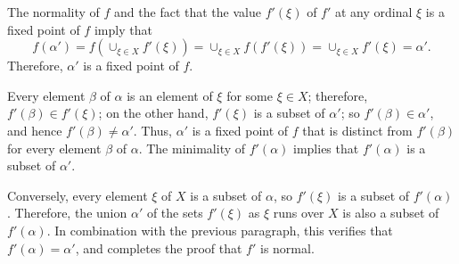\documentclass{article}
\begin{document}
\begin{solution}[\ref{exe:e5fhwe1c}]
  The normality of \(f\) and the fact that the value \(f'(\xi)\) of
  \(f'\) at any ordinal \(\xi\) is a fixed point of \(f\) imply that
  \begin{displaymath}
    f(\alpha') =
    f(\cup_{\xi \in X} f'(\xi)) =
    \cup_{\xi \in X} f(f'(\xi)) =
    \cup_{\xi \in X} f'(\xi) =
    \alpha'.
  \end{displaymath}
  Therefore, \(\alpha'\) is a fixed point of \(f\).

  Every element \(\beta\) of \(\alpha\) is an element of \(\xi\) for
  some \(\xi \in X\); therefore, \(f'(\beta) \in f'(\xi)\); on the
  other hand, \(f'(\xi)\) is a subset of \(\alpha'\); so
  \(f'(\beta) \in \alpha'\), and hence \(f'(\beta) \neq \alpha'\).
  Thus, \(\alpha'\) is a fixed point of \(f\) that is distinct from
  \(f'(\beta)\) for every element \(\beta\) of \(\alpha\).  The
  minimality of \(f'(\alpha)\) implies that \(f'(\alpha)\) is a subset
  of \(\alpha'\).

  Conversely, every element \(\xi\) of \(X\) is a subset of
  \(\alpha\), so \(f'(\xi)\) is a subset of \(f'(\alpha)\).
  Therefore, the union \(\alpha'\) of the sets \(f'(\xi)\) as \(\xi\)
  runs over \(X\) is also a subset of \(f'(\alpha)\).  In combination
  with the previous paragraph, this verifies that
  \(f'(\alpha) = \alpha'\), and completes the proof that \(f'\) is
  normal.
\end{solution}
\end{document}
